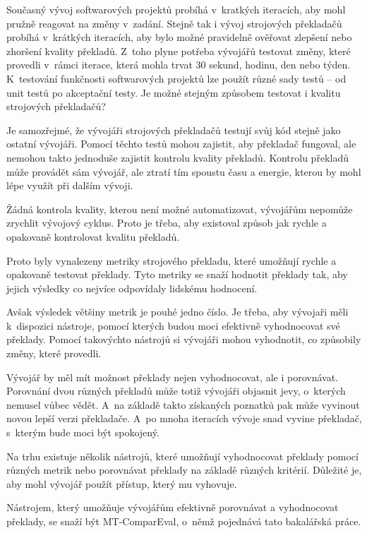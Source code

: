 Současný vývoj softwarových projektů probíhá v~kratkých iteracích,
  aby mohl pružně reagovat na změny v~zadání.
Stejně tak i vývoj strojových překladačů probíhá v~krátkých iteracích,
  aby bylo možné pravidelně ověřovat zlepšení nebo zhoršení kvality překladů.
Z~toho plyne potřeba vývojářů testovat změny,
  které provedli v~rámci iterace,
  která mohla trvat 30 sekund, hodinu, den nebo týden.
K~testování funkčnosti softwarových projektů lze použít různé sady testů -- od unit testů po akceptační testy.
Je možné stejným způsobem testovat i kvalitu strojových překladačů?

Je samozřejmé, 
  že vývojáři strojových překladačů testují svůj kód stejně jako ostatní vývojáři.
Pomocí těchto testů mohou zajistit,
  aby překladač fungoval,
  ale nemohou takto jednoduše zajistit kontrolu kvality překladů.
Kontrolu překladů může provádět sám vývojář,
  ale ztratí tím spoustu času a energie,
  kterou by mohl lépe využít při dalším vývoji.

Žádná kontrola kvality, kterou není možné automatizovat,
  vývojářům nepomůže zrychlit vývojový cyklus.
Proto je třeba,
  aby existoval způsob jak rychle a opakovaně kontrolovat kvalitu překladů.

Proto byly vynalezeny metriky strojového překladu,
  které umožňují rychle a opakovaně testovat překlady.
Tyto metriky se snaží hodnotit překlady tak,
  aby jejich výsledky co nejvíce odpovídaly lidskému hodnocení.

Avšak výsledek většiny metrik je pouhé jedno číslo.
Je třeba, aby vývojaři měli k~dispozici nástroje,
  pomocí kterých budou moci efektivně vyhodnocovat své překlady.
Pomocí takovýchto nástrojů si vývojáři mohou vyhodnotit,
  co způsobily změny, které provedli.

Vývojář by měl mít možnost překlady nejen vyhodnocovat,
  ale i porovnávat.
Porovnání dvou různých překladů může totiž vývojáři objasnit jevy,
  o~kterých nemusel vůbec vědět.
A~na základě takto získaných poznatků pak může vyvinout novou lepší verzi překladače.
A~po mnoha iteracích vývoje snad vyvine překladač,
  s~kterým bude moci být spokojený.

Na trhu existuje několik nástrojů,
  které umožňují vyhodnocovat překlady pomocí různých metrik
  nebo porovnávat překlady na základě různých kritérií.
Důležité je,
  aby mohl vývojář použít přístup,
  který mu vyhovuje.

Nástrojem,
  který umožňuje vývojářům efektivně porovnávat a vyhodnocovat překlady,
  se snaží být MT-ComparEval, 
  o~němž pojednává tato bakalářská práce.
